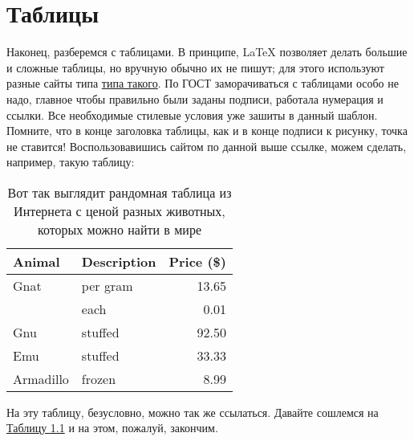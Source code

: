 \chapter{Таблицы}
\thispagestyle{empty}
\label{ch:tab}
    Наконец, разберемся с таблицами. В принципе, \LaTeX{} позволяет делать большие и сложные таблицы, но вручную обычно их не пишут; для этого используют разные сайты типа \href{https://www.tablesgenerator.com/}{типа такого}. По ГОСТ заморачиваться с таблицами особо не надо, главное чтобы правильно были заданы подписи, работала нумерация и ссылки. Все необходимые стилевые условия уже зашиты в данный шаблон. Помните, что в конце заголовка таблицы, как и в конце подписи к рисунку, точка не ставится! Воспользовавишись сайтом по данной выше ссылке, можем сделать, например, такую таблицу:
\begin{table}[ht]
\caption{Вот так выглядит рандомная таблица из Интернета с ценой разных животных, которых можно найти в мире}
\label{tab:t1}
\centering
\begin{tabular}{llr}
\hline
Animal    & Description & Price (\$) \\ \hline
Gnat      & per gram    & 13.65      \\
          & each        & 0.01       \\
Gnu       & stuffed     & 92.50      \\
Emu       & stuffed     & 33.33      \\
Armadillo & frozen      & 8.99       \\ \hline
\end{tabular}
\end{table}

На эту таблицу, безусловно, можно так же ссылаться. Давайте сошлемся на \hyperref[tab:t1]{Таблицу \ref*{tab:t1}} и на этом, пожалуй, закончим.

\endinput